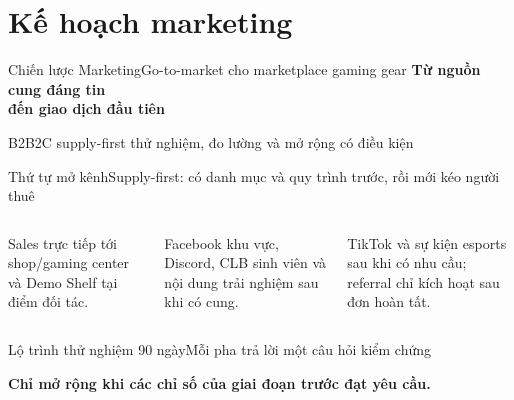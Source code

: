 \section{Kế hoạch marketing}

\begin{frame}{Chiến lược Marketing}{Go-to-market cho marketplace gaming gear}
  \vfill
  \centering
  {\fontsize{36}{42}\selectfont\color{mutuxBlue}\bfseries
    Từ nguồn cung đáng tin\\[.25em]
    đến giao dịch đầu tiên}
  \par\vspace{1.2em}
  \textcolor{cookieMuted}{B2B2C supply-first \textemdash{} thử nghiệm, đo lường và mở rộng có điều kiện}
  \vfill
\end{frame}

\begin{frame}{Thứ tự mở kênh}{Supply-first: có danh mục và quy trình trước, rồi mới kéo người thuê}
  \vspace{1em}
  \begin{columns}[T,onlytextwidth]
      \par\vspace{.45em}
      Sales trực tiếp tới shop/gaming center và Demo Shelf tại điểm đối tác.
      \par\vspace{.45em}
      Facebook khu vực, Discord, CLB sinh viên và nội dung trải nghiệm sau khi có cung.
      \par\vspace{.45em}
      TikTok và sự kiện esports sau khi có nhu cầu; referral chỉ kích hoạt sau đơn hoàn tất.
  \end{columns}
\end{frame}

\begin{frame}{Lộ trình thử nghiệm 90 ngày}{Mỗi pha trả lời một câu hỏi kiểm chứng}
  \vspace{1.4em}
  \centering
  \vfill
  \centering\textcolor{mutuxOrange}{\textbf{Chỉ mở rộng khi các chỉ số của giai đoạn trước đạt yêu cầu.}}
\end{frame}

